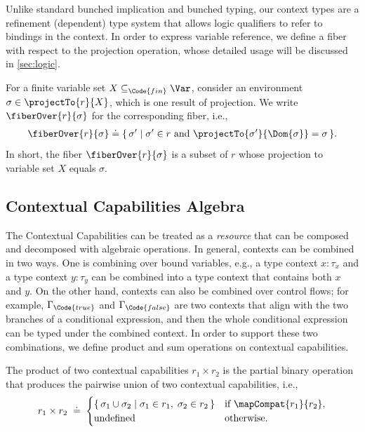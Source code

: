 Unlike standard bunched implication and bunched typing, our context types are a refinement (dependent) type system that allows logic qualifiers to refer to bindings in the context. In order to express variable reference, we define a fiber with respect to the projection operation, whose detailed usage will be discussed in \autoref{sec:logic}.

\begin{definition}[Fibers]\label{def:fibers}
  For a finite variable set $X \subseteq_{\Code{fin}} \Var$, consider an environment $\sigma \in \projectTo{r}{X}$, which is one result of projection. We write $\fiberOver{r}{\sigma}$ for the corresponding fiber, i.e.,
  \begin{align*}
    \fiberOver{r}{\sigma} \doteq \{\, \sigma' \mid \sigma' \in r \text{ and } \projectTo{\sigma'}{\Dom{\sigma}} = \sigma \,\}.
  \end{align*}\noindent
  In short, the fiber $\fiberOver{r}{\sigma}$ is a subset of $r$ whose projection to variable set $X$ equals $\sigma$.
\end{definition}

\subsection{Contextual Capabilities Algebra}

The Contextual Capabilities can be treated as a \emph{resource} that can be composed and decomposed with algebraic operations. In general, contexts can be combined in two ways. One is combining over bound variables, e.g., a type context $x{:}\tau_x$ and a type context $y{:}\tau_y$ can be combined into a type context that contains both $x$ and $y$. On the other hand, contexts can also be combined over control flows; for example, $\Gamma_{\Code{true}}$ and $\Gamma_{\Code{false}}$ are two contexts that align with the two branches of a conditional expression, and then the whole conditional expression can be typed under the combined context. In order to support these two combinations, we define product and sum operations on contextual capabilities.

\begin{definition}\label{def:contextual-capabilities-product}
  The product of two contextual capabilities $r_1 \times r_2$ is the partial binary operation that produces the pairwise union of two contextual capabilities, i.e.,
  \[
    r_1 \times r_2 \;\doteq\;
    \begin{cases}
      \{\, \sigma_1 \cup \sigma_2 \mid \sigma_1 \in r_1,\; \sigma_2 \in r_2 \,\}
        & \text{if } \mapCompat{r_1}{r_2}, \\
        \text{undefined}
        & \text{otherwise.}
      \end{cases}
  \]
\end{definition}

